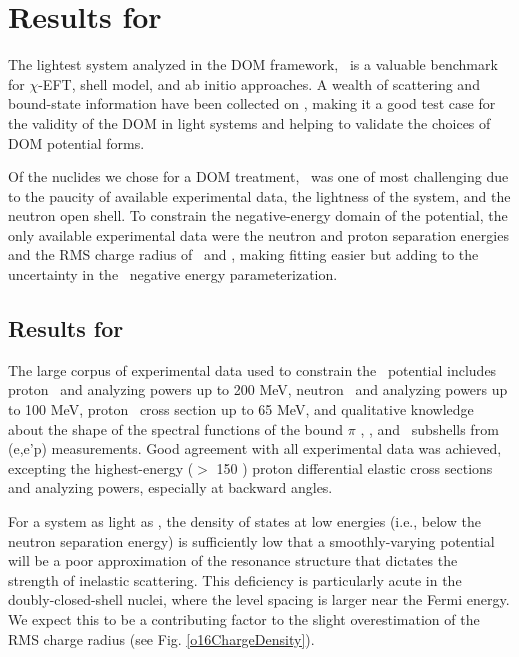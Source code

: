 \section{Results for \oSixEight}
The lightest system analyzed in the DOM framework, \oSix\ is a valuable benchmark
for $\chi$-EFT, shell model, and ab initio approaches. A wealth of scattering and
bound-state information have been collected on \oSix, making it a good test case for the validity
of the DOM in light systems and helping to validate the choices of DOM potential forms.

Of the nuclides we chose for a DOM treatment, \oEight\ was one of most challenging due to the 
paucity of
available experimental data, the lightness of the system, and the neutron open shell.
To constrain the negative-energy domain
of the potential, the only available experimental data were the neutron and proton separation
energies and the RMS charge radius of \oEight\ and \neEight, making fitting easier but adding to the
uncertainty in the \oEight\ negative energy parameterization.

\subsection{Results for \oSix}
The large corpus of experimental data used to constrain the \oSix\
potential includes proton \el\ and analyzing powers up to 200 MeV, neutron \el\ and analyzing powers
up to 100 MeV, proton \rxn\ cross section up to 65 MeV, and qualitative knowledge about the shape of
the spectral functions of the bound $\pi$ \sOne, \pThree, and \pOne\ subshells from (e,e'p)
measurements. Good agreement with all 
experimental data was achieved, excepting the highest-energy ($>$ 150 \mega\electronvolt)
proton differential elastic cross sections and analyzing powers, especially at backward angles.

For a system as light as \oSix, the density of states at low energies (i.e., below the neutron
separation energy) is sufficiently low that a smoothly-varying potential will be a poor
approximation of the resonance structure that dictates the strength of inelastic scattering. This
deficiency is particularly acute in the doubly-closed-shell nuclei, where the level spacing is
larger near the Fermi energy. We expect this to be a contributing factor to the slight
overestimation of the RMS charge radius (see Fig. \ref{o16ChargeDensity}).

